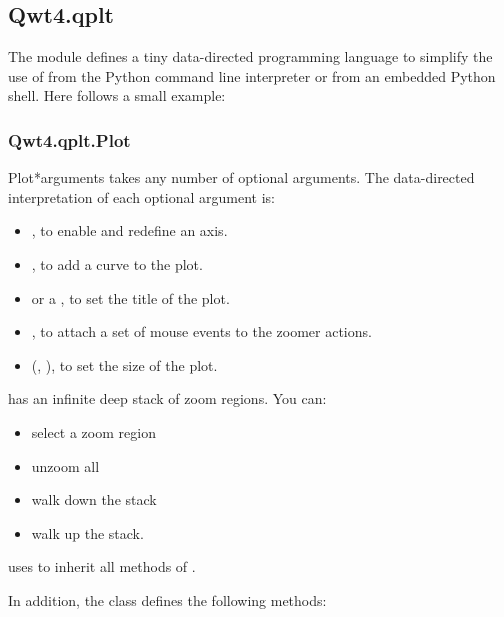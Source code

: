 \documentclass{manual}
\newcommand{\Download}{\ulink{download}
  {http://pyqwt.sourceforge.net/download.html}}
\newcommand{\Future}{
  \begin{notice}[warning]
    The documentation is for the future PyQwt-4.2.2 which is only available
    from CVS. The \Download{} page has links for the latest releases.
  \end{notice}
}
\renewcommand{\Future}{}
\begin{document}
\subsection{Qwt4.qplt \label{qwt-qplt}}

\Future{}

The module  defines a tiny data-directed programming
language to simplify the use of  from the Python command
line interpreter or from an embedded Python shell.
Here follows a small example:



\subsubsection{Qwt4.qplt.Plot \label{intro-qplt-plot}}

\Future{}

\begin{classdesc}{Plot}{*arguments}
   takes any number of optional arguments.
  The data-directed interpretation of each optional argument is:
  \begin{itemize}
  \item
    , to enable and redefine an axis.
  \item
    , to add a curve to the plot.
  \item
     or a , to set the title of the plot.
  \item
    , to attach a set of mouse events to the zoomer actions.
  \item
    (, ), to set the size of the plot.
  \end{itemize}

   has an infinite deep stack of zoom regions. You can:
  \begin{itemize}
    \item
      select a zoom region
    \item
      unzoom all
    \item
      walk down the stack
    \item
      walk up the stack.
  \end{itemize}

   uses  to inherit all methods of
  .
\end{classdesc}

In addition, the class  defines the following methods:
\end{document}
